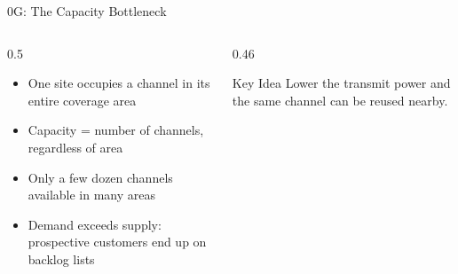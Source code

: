 \begin{frame}{0G: The Capacity Bottleneck}
  \begin{columns}[T,onlytextwidth]
    \begin{column}{0.5\textwidth}
      \begin{itemize}
        \item One site occupies a channel in its entire coverage area
        \item Capacity = number of channels, regardless of area
        \item Only a few dozen channels available in many areas
        \item Demand exceeds supply: prospective customers end up on backlog lists
      \end{itemize}
    \end{column}
    \begin{column}{0.46\textwidth}
      \centering
      
      \begin{block}{Key Idea}
        Lower the transmit power and the same channel can be reused nearby.
      \end{block}
    \end{column}
  \end{columns}
\end{frame}



